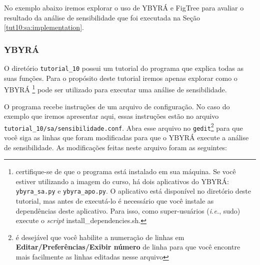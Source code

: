 \begin{refsection}

No exemplo abaixo iremos explorar o uso de YBYRÁ e FigTree para avaliar o resultado da análise de sensibilidade que foi executada na Seção \ref{tut10:sa:implementation}.

\subsubsection{YBYRÁ}\label{tut10:sa:evaluation:ybyra}

O diretório \texttt{tutorial\_10} possui um tutorial do programa que explica todas as suas funções. Para o propósito deste tutorial iremos apenas explorar como o YBYRÁ \footnote{ certifique-se de que o programa está instalado em sua máquina. Se você estiver utilizando a imagem do curso, há dois aplicativos do YBYRÁ: \texttt{ybyra\_sa.py} e \texttt{ybyra\_apo.py}. O aplicativo está disponível no diretório deste tutorial, mas antes de executá-lo é necessário que você instale as dependências deste aplicativo. Para isso, como super-usuários (\textit{i.e.}, sudo) execute o \textit{script} install\_dependencies.sh.} pode ser utilizado para executar uma análise de sensibilidade.

O programa recebe instruções de um arquivo de configuração. No caso do exemplo que iremos apresentar aqui, essas instruções estão no arquivo \texttt{tutorial\_10/sa/sensibilidade.conf}. Abra esse arquivo no \texttt{gedit}\footnote{ é desejável que você habilite a numeração de linhas em \textbf{Editar/Preferências/Exibir número} de linha para que você encontre mais facilmente as linhas editadas nesse arquivo} para que você siga as linhas que foram modificadas para que o YBYRÁ execute a análise de sensibilidade. As modificações feitas neste arquivo foram as seguintes:


\end{refsection}
